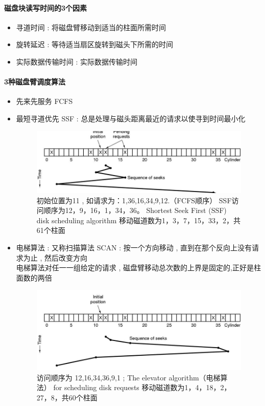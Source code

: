 \documentclass[UTF8,a4paper]{ctexart}
\begin{document}
\paragraph{磁盘块读写时间的3个因素}
\begin{itemize}
	\item 寻道时间 : 将磁盘臂移动到适当的柱面所需时间
	\item 旋转延迟 : 等待适当扇区旋转到磁头下所需的时间
	\item 实际数据传输时间 : 实际数据传输时间
\end{itemize}

\paragraph{3种磁盘臂调度算法}
\begin{itemize}
	\item 先来先服务 FCFS 
	\item 最短寻道优先 SSF : 总是处理与磁头距离最近的请求以使寻到时间最小化
	\begin{figure}[H]
		\centering
		\includegraphics[scale = 0.5]{assets/ModernOperatingSystems/2018-01-10-18-04-58.png}
		\caption{初始位置为11 , 如请求为：1,36,16,34,9,12.（FCFS顺序）
SSF访问顺序为12，9，16，1，34，36。
Shortest Seek First (SSF) disk scheduling algorithm
移动磁道数为1，3，7，15，33，2，共61个柱面}
	\end{figure}
	
	\item 电梯算法 : 又称扫描算法 SCAN : 按一个方向移动 , 直到在那个反向上没有请求为止 , 然后改变方向\\
	电梯算法对任一一组给定的请求 , 磁盘臂移动总次数的上界是固定的,正好是柱面数的两倍

	\begin{figure}[H]
		\centering
		\includegraphics[scale = 0.5]{assets/ModernOperatingSystems/2018-01-10-18-05-23.png}
		\caption{访问顺序为 12,16,34,36,9,1 ; 
The elevator algorithm（电梯算法） for scheduling disk requests
移动磁道数为1，4，18，2，27，8，共60个柱面}
	\end{figure}
	
\end{itemize}
\end{document}

